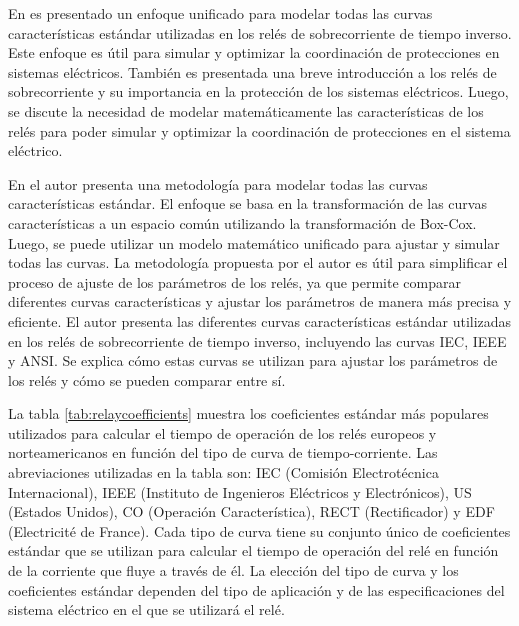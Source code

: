 \documentclass[journal,article,submit,pdftex,moreauthors]{Definitions/mdpi}
\begin{document}
En \cite{alroomi2017optimal} es presentado un enfoque unificado para modelar todas las curvas características estándar utilizadas en los relés de sobrecorriente de tiempo inverso. Este enfoque es útil para simular y optimizar la coordinación de protecciones en sistemas eléctricos. También es presentada una breve introducción a los relés de sobrecorriente y su importancia en la protección de los sistemas eléctricos. Luego, se discute la necesidad de modelar matemáticamente las características de los relés para poder simular y optimizar la coordinación de protecciones en el sistema eléctrico. 

En \cite{alroomi2017optimal} el autor presenta una metodología para modelar todas las curvas características estándar. El enfoque se basa en la transformación de las curvas características a un espacio común utilizando la transformación de Box-Cox. Luego, se puede utilizar un modelo matemático unificado para ajustar y simular todas las curvas. La metodología propuesta por el autor es útil para simplificar el proceso de ajuste de los parámetros de los relés, ya que permite comparar diferentes curvas características y ajustar los parámetros de manera más precisa y eficiente. El autor presenta las diferentes curvas características estándar utilizadas en los relés de sobrecorriente de tiempo inverso, incluyendo las curvas IEC, IEEE y ANSI. Se explica cómo estas curvas se utilizan para ajustar los parámetros de los relés y cómo se pueden comparar entre sí.


La tabla \ref{tab:relaycoefficients} muestra los coeficientes estándar más populares utilizados para calcular el tiempo de operación de los relés europeos y norteamericanos en función del tipo de curva de tiempo-corriente. Las abreviaciones utilizadas en la tabla son: IEC (Comisión Electrotécnica Internacional), IEEE (Instituto de Ingenieros Eléctricos y Electrónicos), US (Estados Unidos), CO (Operación Característica), RECT (Rectificador) y EDF (Electricité de France). Cada tipo de curva tiene su conjunto único de coeficientes estándar que se utilizan para calcular el tiempo de operación del relé en función de la corriente que fluye a través de él. La elección del tipo de curva y los coeficientes estándar dependen del tipo de aplicación y de las especificaciones del sistema eléctrico en el que se utilizará el relé.
\end{document}

